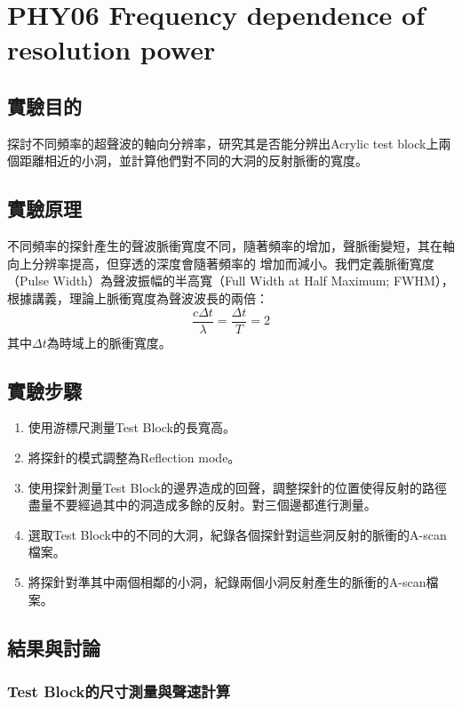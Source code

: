 \documentclass[12pt]{report}
\begin{document}
\chapter{PHY06 Frequency dependence of resolution power}\label{PHY06}

\section{實驗目的}
探討不同頻率的超聲波的軸向分辨率，研究其是否能分辨出Acrylic test block上兩個距離相近的小洞，並計算他們對不同的大洞的反射脈衝的寬度。

\section{實驗原理}

不同頻率的探針產生的聲波脈衝寬度不同，隨著頻率的增加，聲脈衝變短，其在軸向上分辨率提高，但穿透的深度會隨著頻率的
增加而減小。我們定義脈衝寬度（Pulse Width）為聲波振幅的半高寬（Full Width at Half Maximum; FWHM），根據講義，理論上脈衝寬度為聲波波長的兩倍：
\begin{equation}
    \frac{c\Delta t}{\lambda} = \frac{\Delta t}{T} = 2
\end{equation}
其中$\Delta t$為時域上的脈衝寬度。

\section{實驗步驟}

\begin{enumerate}
    \item 使用游標尺測量Test Block的長寬高。
    \item 將探針的模式調整為Reflection mode。
    \item 使用探針測量Test Block的邊界造成的回聲，調整探針的位置使得反射的路徑盡量不要經過其中的洞造成多餘的反射。對三個邊都進行測量。
    \item 選取Test Block中的不同的大洞，紀錄各個探針對這些洞反射的脈衝的A-scan檔案。
    \item 將探針對準其中兩個相鄰的小洞，紀錄兩個小洞反射產生的脈衝的A-scan檔案。
\end{enumerate}

\section{結果與討論}

\subsection{Test Block的尺寸測量與聲速計算}
\end{document}
